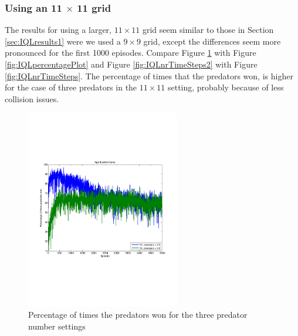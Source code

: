 \FloatBarrier
\clearpage
\subsubsection{Using an 11 $\times$ 11 grid}

The results for using a larger, $11 \times 11$ grid seem similar to those in Section \ref{sec:IQLresults1} were we used a $9 \times 9$ grid, except the differences seem more pronounced for the first 1000 episodes.
Compare Figure \ref{fig:IQLpercentagePlot2} with Figure \ref{fig:IQLpercentagePlot} and Figure \ref{fig:IQLnrTimeSteps2} with Figure \ref{fig:IQLnrTimeSteps}. The percentage of times that the predators won, is  higher for the case of three predators in the $11 \times 11$ setting, probably because of less collision issues.

\begin{figure}[hbt]
\centering
\includegraphics[bb = 0.6in 3in 7.9in 8.3in,clip,width=0.6\textwidth]
{IQLpercentageWinning5000episodesavg200trials.pdf} 
\caption{Percentage of times the predators won for the three predator number settings}
\label{fig:IQLpercentagePlot2}
\end{figure}
